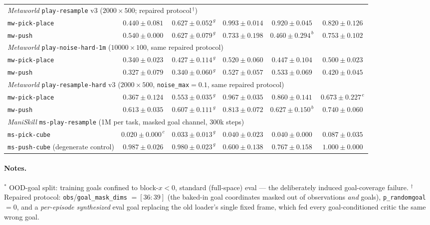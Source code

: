 \documentclass[10pt]{article}
\begin{document}
\begin{table}[h]
{\begin{tabular}{l ccccc}
\midrule
\multicolumn{6}{l}{\emph{Metaworld} \texttt{play-resample} v3 ($2000\times500$; repaired protocol$^{\,\dagger}$)}\\
\texttt{mw-pick-place} & $0.440\pm0.081$ & $0.627\pm0.052^{\,g}$ & $\mathbf{0.993\pm0.014}$ & $0.920\pm0.045$          & $0.820\pm0.126$ \\
\texttt{mw-push}       & $0.540\pm0.000$ & $0.627\pm0.079^{\,g}$ & $0.733\pm0.198$          & $0.460\pm0.294^{\,b}$    & $0.753\pm0.102$ \\
\midrule
\multicolumn{6}{l}{\emph{Metaworld} \texttt{play-noise-hard-1m} ($10000\times100$, same repaired protocol)}\\
\texttt{mw-pick-place} & $0.340\pm0.023$ & $0.427\pm0.114^{\,g}$ & $0.520\pm0.060$          & $0.447\pm0.104$          & $0.500\pm0.023$ \\
\texttt{mw-push}       & $0.327\pm0.079$ & $0.340\pm0.060^{\,g}$ & $0.527\pm0.057$          & $0.533\pm0.069$          & $0.420\pm0.045$ \\
\midrule
\multicolumn{6}{l}{\emph{Metaworld} \texttt{play-resample-hard} v3 ($2000\times500$, \texttt{noise\_max}$=0.1$, same repaired protocol)}\\
\texttt{mw-pick-place} & $0.367\pm0.124$ & $0.553\pm0.035^{\,g}$ & $\mathbf{0.967\pm0.035}$ & $0.860\pm0.141$          & $0.673\pm0.227^{\,e}$ \\
\texttt{mw-push}       & $0.613\pm0.035$ & $0.607\pm0.111^{\,g}$ & $0.813\pm0.072$          & $0.627\pm0.150^{\,b}$    & $0.740\pm0.060$ \\
\midrule
\multicolumn{6}{l}{\emph{ManiSkill} \texttt{ms-play-resample} (1M per task, masked goal channel, 300k steps)}\\
\texttt{ms-pick-cube}  & $0.020\pm0.000^{\,c}$ & $0.033\pm0.013^{\,g}$ & $0.040\pm0.023$    & $0.040\pm0.000$          & $\mathbf{0.087\pm0.035}$ \\
\texttt{ms-push-cube} (degenerate control)
                       & $0.987\pm0.026$ & $0.980\pm0.023^{\,g}$ & $0.600\pm0.138$          & $0.767\pm0.158$          & $1.000\pm0.000$ \\
\bottomrule
\end{tabular}}
\end{table}

\paragraph{Notes.}
$^{\ast}$ OOD-goal split: training goals confined to block-$x<0$, standard (full-space)
eval --- the deliberately induced goal-coverage failure. $^{\dagger}$ Repaired protocol:
\texttt{obs}/\texttt{goal\_mask\_dims} $=[36{:}39]$ (the baked-in goal coordinates masked
out of observations \emph{and} goals), \texttt{p\_randomgoal}$=0$, and a \emph{per-episode
synthesized} eval goal replacing the old loader's single fixed frame, which fed every
goal-conditioned critic the same wrong goal.
\end{document}
